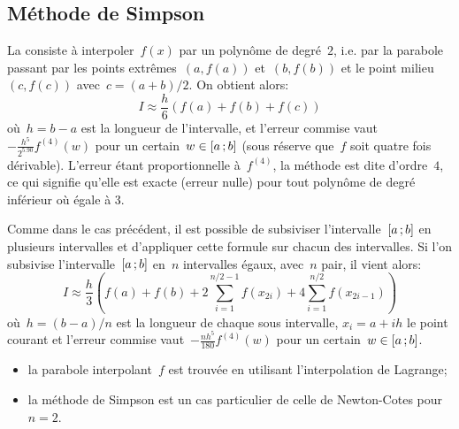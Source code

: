 \subsection{Méthode de Simpson} 
La  consiste à interpoler~$f(x)$ par un polynôme de degré~$2$, i.e. par la parabole passant par les points extrêmes~$(a,f(a))$ et~$(b,f(b))$ et le point milieu~$(c,f(c))$ avec~$c=(a+b)/2$. On obtient alors: 
\begin{equation}
 I\approx \frac{h}{6} \left( f(a)+f(b)+f(c)\right)
\end{equation}
où~$h=b-a$ est la longueur de l'intervalle, et l'erreur commise vaut~$-\frac{h^5}{2^5.90} f^{(4)}(w)$ pour un certain~$w\in\mathopen{[}a\,;b\mathclose{]}$ (sous réserve que~$f$ soit quatre fois dérivable). L'erreur étant proportionnelle à~$f^{(4)}$, la méthode est dite d'ordre~$4$, ce qui signifie qu'elle est exacte (erreur nulle) pour tout polynôme de degré inférieur où égale à 3. 

Comme dans le cas précédent, il est possible de subsiviser l'intervalle~$\mathopen{[}a\,;b\mathclose{]}$ en plusieurs intervalles et d'appliquer cette formule sur chacun des intervalles. Si l'on subsivise l'intervalle~$\mathopen{[}a\,;b\mathclose{]}$ en~$n$ intervalles égaux, avec~$n$ pair, il vient alors: 
\begin{equation}
 I\approx \frac{h}{3} \left( f(a)+f(b)+2\sum_{i=1}^{n/2-1}f(x_{2i})+4\sum_{i=1}^{n/2}f(x_{2i-1}) \right)
\end{equation}
où~$h=(b-a)/n$ est la longueur de chaque sous intervalle, $x_i=a+ih$ le point courant et l'erreur commise vaut~$-\frac{nh^5}{180} f^{(4)}(w)$ pour un certain~$w\in\mathopen{[}a\,;b\mathclose{]}$. 
\begin{remarque}[Remarques]\mbox{}
\begin{itemize}
\item la parabole interpolant~$f$ est trouvée en utilisant l'interpolation de Lagrange; 
\item la méthode de Simpson est un cas particulier de celle de Newton-Cotes pour~$n=2$. 
\end{itemize}
\end{remarque}
